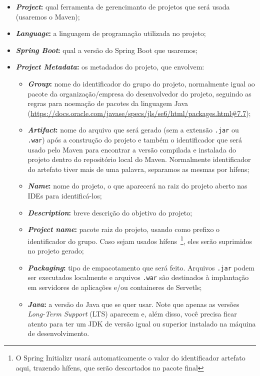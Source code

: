\begin{itemize}
    \item \textbf{\textit{Project}:} qual ferramenta de gerencimanto de projetos que será usada (usaremos o Maven);
    \item \textbf{\textit{Language}:} a linguagem de programação utilizada no projeto;
    \item \textbf{\textit{Spring Boot}:} qual a versão do Spring Boot que usaremos;
    \item \textbf{\textit{Project Metadata}:} os metadados do projeto, que envolvem:
    \begin{itemize}
        \item \textbf{\textit{Group}:} nome do identificador do grupo do projeto, normalmente igual ao pacote da organização/empresa do desenvolvedor do projeto, seguindo as regras para noemação de pacotes da linguagem Java (\url{https://docs.oracle.com/javase/specs/jls/se6/html/packages.html#7.7});
        \item \textbf{\textit{Artifact}:} nome do arquivo que será gerado (sem a extensão \texttt{.jar} ou \texttt{.war}) após a construção do projeto e também o identificador que será usado pelo Maven para encontrar a versão compilada e instalada do projeto dentro do repositório local do Maven. Normalmente identificador do artefato tiver mais de uma palavra, separamos as mesmas por hífens;
        \item \textbf{\textit{Name}:} nome do projeto, o que aparecerá na raiz do projeto aberto nas IDEs para identificá-los;
        \item \textbf{\textit{Description}:} breve descrição do objetivo do projeto;
        \item \textbf{\textit{Project name}:} pacote raiz do projeto, usando como prefixo o identificador do grupo. Caso sejam usados hífens~\footnote{O Spring Initializr usará automaticamente o valor do identificador artefato aqui, trazendo hífens, que serão descartados no pacote final}, eles serão suprimidos no projeto gerado;
        \item \textbf{\textit{Packaging}:} tipo de empacotamento que será feito. Arquivos \texttt{.jar} podem ser executados localmente e arquivos \texttt{.war} são destinados à implantação em servidores de aplicações e/ou containeres de Servetls;
        \item \textbf{\textit{Java}:} a versão do Java que se quer usar. Note que apenas as versões \textit{Long-Term Support} (LTS) aparecem e, além disso, você precisa ficar atento para ter um JDK de versão igual ou superior instalado na máquina de desenvolvimento.
    \end{itemize}
\end{itemize}

